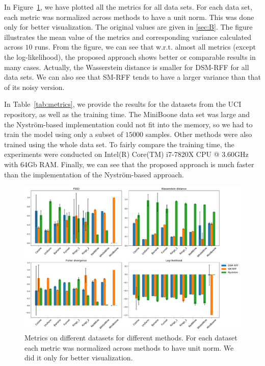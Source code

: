 In Figure~\ref{fig:metrics}, we have plotted all the metrics for all data sets.
For each data set, each metric was normalized across methods to have a unit norm.
This was done only for better visualization.
The original values are given in \ref{sec:B}.
The figure illustrates the mean value of the metrics and corresponding variance
calculated across $10$ runs.
From the figure, we can see that w.r.t. almost all metrics (except the log-likelihood),
the proposed approach shows better or comparable results in many cases.
Actually, the Wasserstein distance is smaller for DSM-RFF for all data sets.
We can also see that SM-RFF tends to have a larger variance than that of its noisy version.

In Table~\ref{tab:metrics}, we provide the results for the datasets from the UCI repository,
as well as the training time.
The MiniBoone data set was large and the Nystr\"om-based implementation
could not fit into the memory, so we had to train the model using only a subset of
$15000$ samples.
Other methods were also trained using the whole data set.
To fairly compare the training time, the experiments were conducted on
Intel(R) Core(TM) i7-7820X CPU @ 3.60GHz with 64Gb RAM.
Finally, we can see that the proposed approach is much faster than the implementation
of the Nystr\"om-based approach.


\begin{figure}[h]
  \centering
  \includegraphics[width=\textwidth]{figures/score_matching/exps/metrics.pdf}
  \caption{Metrics on different datasets for different methods.
           For each dataset each metric was normalized across methods
           to have unit norm.
           We did it only for better visualization.}
  \label{fig:metrics}
\end{figure}

